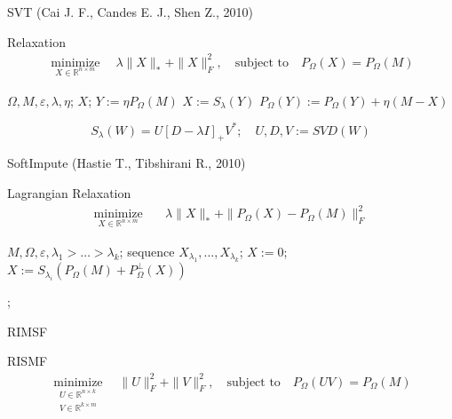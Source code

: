 \documentclass{beamer}
\begin{document}
\begin{frame}{SVT (Cai J. F., Candes E. J., Shen Z., 2010)}
		\begin{block}{Relaxation}
			\vspace{-0.5cm}
			\begin{align*}
			\mathop{\text{minimize}}\limits_{X \in \mathbb{R}^{n \times m}} \quad \lambda \| X \|_* + \| X \|_F^2, \quad
			\text{subject to} \quad P_{\Omega} (X) = P_{\Omega} (M)
			\end{align*}
		\end{block}
	\vspace{0.3cm}
	\begin{algorithmic}[1]
		\REQUIRE $\Omega, M, \varepsilon, \lambda, \eta$;
		\ENSURE $X$;
		\STATE $Y := \eta P_{\Omega}(M)$
		\REPEAT
		\STATE $X := S_{\lambda} (Y)$
		\STATE $P_{\Omega}\left(Y\right) := P_{\Omega}\left(Y\right)+\eta\left(M - X\right)$
	\end{algorithmic}
	\vspace{0.3cm}
$$
S_{\lambda} (W) = U [D - \lambda I]_+ V^*; \quad U, D, V := SVD(W)
$$
\end{frame}
\begin{frame}{SoftImpute (Hastie T., Tibshirani R., 2010)}
		\begin{block}{Lagrangian Relaxation}
			\vspace{-0.5cm}
			\begin{align*}
			\mathop{\text{minimize}}\limits_{X \in \mathbb{R}^{n \times m}} \quad & 
			\lambda \| X \|_* + \|P_\Omega(X) - P_\Omega(M) \|_F^2
			\end{align*}
		\end{block}

\begin{algorithmic}[1]
	\REQUIRE $M, \Omega, \varepsilon, \lambda_1 > \dots > \lambda_k$;
	\ENSURE sequence $X_{\lambda_1}, \dots, X_{\lambda_k}$;
	\STATE $X := 0$;
	\REPEAT
	\STATE $X := S_{\lambda_i} (P_\Omega(M) + P_\Omega^\bot (X))$
	
	;
	\ENDFOR
\end{algorithmic}
\end{frame}
\begin{frame}{RIMSF}

\begin{block}{RISMF}
	\vspace{-0.3cm}
	\begin{align*}
	\mathop{\text{minimize}}\limits_{\substack{	U \in \mathbb{R}^{n \times k} \\ V \in \mathbb{R}^{k \times m}}} \quad \| U \|^2_F + \| V \|^2_F, \quad
	\text{subject to} \quad P_{\Omega} (UV) = P_{\Omega} (M) 
	\end{align*}
\end{block}
	\vspace{0.3cm}
	
\end{frame}
\end{document}
